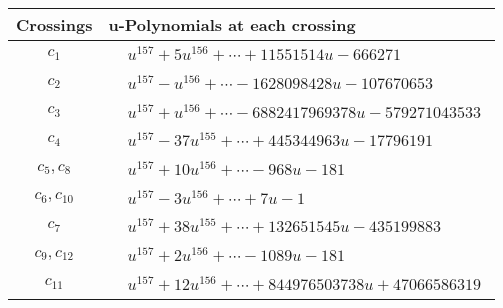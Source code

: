 \documentclass[1p]{elsarticle_modified}
\theoremstyle{definition}
\begin{document}
\begin{tabular}{m{50pt}|m{274pt}}
Crossings & \hspace{64pt}u-Polynomials at each crossing \\
\hline $$\begin{aligned}c_{1}\end{aligned}$$&$\begin{aligned}
&u^{157}+5 u^{156}+\cdots+11551514 u-666271
\end{aligned}$\\
\hline $$\begin{aligned}c_{2}\end{aligned}$$&$\begin{aligned}
&u^{157}- u^{156}+\cdots-1628098428 u-107670653
\end{aligned}$\\
\hline $$\begin{aligned}c_{3}\end{aligned}$$&$\begin{aligned}
&u^{157}+u^{156}+\cdots-6882417969378 u-579271043533
\end{aligned}$\\
\hline $$\begin{aligned}c_{4}\end{aligned}$$&$\begin{aligned}
&u^{157}-37 u^{155}+\cdots+445344963 u-17796191
\end{aligned}$\\
\hline $$\begin{aligned}c_{5},c_{8}\end{aligned}$$&$\begin{aligned}
&u^{157}+10 u^{156}+\cdots-968 u-181
\end{aligned}$\\
\hline $$\begin{aligned}c_{6},c_{10}\end{aligned}$$&$\begin{aligned}
&u^{157}-3 u^{156}+\cdots+7 u-1
\end{aligned}$\\
\hline $$\begin{aligned}c_{7}\end{aligned}$$&$\begin{aligned}
&u^{157}+38 u^{155}+\cdots+132651545 u-435199883
\end{aligned}$\\
\hline $$\begin{aligned}c_{9},c_{12}\end{aligned}$$&$\begin{aligned}
&u^{157}+2 u^{156}+\cdots-1089 u-181
\end{aligned}$\\
\hline $$\begin{aligned}c_{11}\end{aligned}$$&$\begin{aligned}
&u^{157}+12 u^{156}+\cdots+844976503738 u+47066586319
\end{aligned}$\\
\hline
\end{tabular}\\~\\
\end{document}
